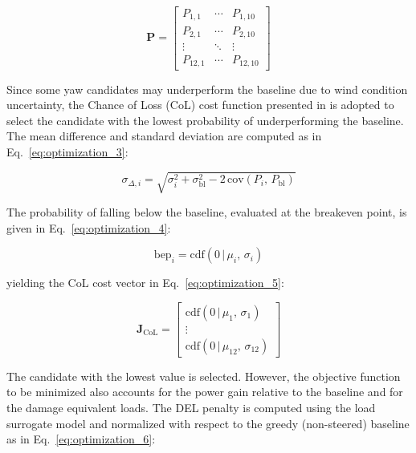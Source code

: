 \documentclass[final,5p,times,twocolumn]{elsarticle}
\begin{document}
\begin{equation}
\label{eq:optimization_2}
\mathbf{P} =
\begin{bmatrix}
P_{1,1} & \cdots & P_{1,10} \\
P_{2,1} & \cdots & P_{2,10} \\
\vdots  & \ddots & \vdots   \\
P_{12,1} & \cdots & P_{12,10}
\end{bmatrix}
\end{equation}

Since some yaw candidates may underperform the baseline due to wind condition uncertainty, the Chance of Loss (CoL) cost function presented in \cite{Becker_2026} is adopted to select the candidate with the lowest probability of underperforming the baseline. The mean difference and standard deviation are computed as in Eq.~\ref{eq:optimization_3}:

\begin{equation}
\label{eq:optimization_3}
\sigma_{\Delta,i} = \sqrt{\sigma_{i}^2 + \sigma_{\mathrm{bl}}^2 
- 2\,\mathrm{cov}(P_{i},\, P_{\mathrm{bl}})}
\end{equation}

The probability of falling below the baseline, evaluated at the breakeven point, is given in Eq.~\ref{eq:optimization_4}:

\begin{equation}
\label{eq:optimization_4}
\mathrm{bep}_i = \mathrm{cdf}(0\,|\,\mu_i,\, \sigma_i)
\end{equation}

yielding the CoL cost vector in Eq.~\ref{eq:optimization_5}:

\begin{equation}
\label{eq:optimization_5}
\mathbf{J}_{\mathrm{CoL}} =
\begin{bmatrix}
\mathrm{cdf}(0\,|\,\mu_1,\, \sigma_1) \\
\vdots \\
\mathrm{cdf}(0\,|\,\mu_{12},\, \sigma_{12})
\end{bmatrix}
\end{equation}

The candidate with the lowest value is selected. However, the objective function to be minimized also accounts for the power gain relative to the baseline and for the damage equivalent loads. The DEL penalty is computed using the load surrogate model and normalized with respect to the greedy (non-steered) baseline as in Eq.~\ref{eq:optimization_6}:
\end{document}
